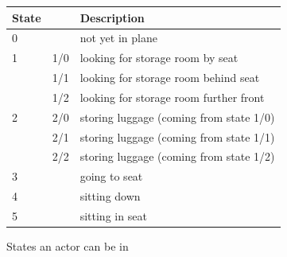 \documentclass[11pt]{article}
\begin{document}
\begin{figure}[h!]
	\center
\begin{tabular}{|ll|l|}
	\hline
	State & &Description\\
	\hline
0 &     & not yet in plane                        \\
\hline
1 & 1/0 & looking for storage room by seat        \\
  & 1/1 & looking for storage room behind seat    \\
  & 1/2 & looking for storage room further front  \\
  \hline
2 & 2/0 & storing luggage (coming from state 1/0) \\
  & 2/1 & storing luggage (coming from state 1/1) \\
  & 2/2 & storing luggage (coming from state 1/2) \\
  \hline
3 &     & going to seat                           \\
\hline
4 &     & sitting down                            \\
\hline
5 &     & sitting in seat       \\                 
\hline

\end{tabular}
\caption{States an actor can be in}
\label{tab:states}
\end{figure}
\end{document}
